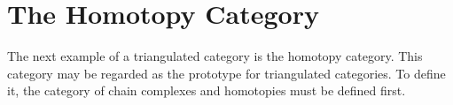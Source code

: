 




\section{The Homotopy Category}
    
    The next example of a triangulated category is the homotopy category. This category may be regarded as the prototype for triangulated categories. To define it, the category of chain complexes and homotopies must be defined first.

